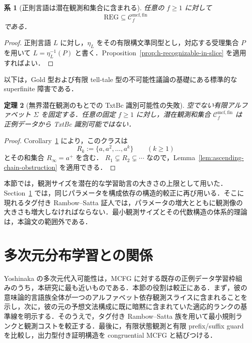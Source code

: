 \documentclass[11pt,a4paper]{ltjsarticle}
\numberwithin{equation}{section}
\theoremstyle{plain}
\newtheorem{theorem}{定理}[section]
\newtheorem{corollary}[theorem]{系}
\theoremstyle{definition}
\theoremstyle{remark}
\newcommand{\Callobs}[1]{\mathcal{C}^{\mathrm{mcf},\mathrm{fin}}_{#1}}
\begin{document}
\begin{corollary}[正則言語は潜在観測和集合に含まれる]
\label{cor:regular-in-latent-union}
任意の \(f\ge1\) に対して
\[
  \mathrm{REG}\subseteq\Callobs{f}
\]
である．
\end{corollary}

\begin{proof}
正則言語 \(L\) に対し，\(\eta_L\) をその有限構文準同型とし，対応する受理集合 \(P\) を用いて \(L=\eta_L^{-1}(P)\) と書く．Proposition~\ref{prop:h-recognizable-in-slice} を適用すればよい．
\end{proof}

以下は，Gold 型および有限 tell-tale 型の不可能性議論の基礎にある標準的な superfinite 障害である．

\begin{theorem}[無界潜在観測のもとでの TxtBc 識別可能性の失敗]
\label{thm:no-advice-nonidentifiability}
空でない有限アルファベット \(\Sigma\) を固定する．任意の固定 \(f\ge1\) に対し，潜在観測和集合 \(\Callobs{f}\) は正例データから TxtBc 識別可能ではない．
\end{theorem}

\begin{proof}
Corollary~\ref{cor:regular-in-latent-union} により，このクラスは
\[
  R_k:=\{a,a^2,\ldots,a^k\}\qquad(k\ge1)
\]
とその和集合 \(R_\infty=a^+\) を含む．
\(R_1\subsetneq R_2\subsetneq\cdots\) なので，Lemma~\ref{lem:ascending-chain-obstruction} を適用できる．
\end{proof}

本節では，観測サイズを潜在的な学習助言の大きさの上限として用いた．Section~\ref{sec:comparison} では，同じパラメータを構成依存の構造的較正に再び用いる．そこに現れるタグ付き Rambow--Satta 証人では，パラメータの増大とともに観測像の大きさも増大しなければならない．最小観測サイズとその代数構造の体系的理論は，本論文の範囲外である．

\section{多次元分布学習との関係}
\label{sec:comparison}

Yoshinaka の多次元代入可能性は，MCFG に対する既存の正例データ学習枠組みのうち，本研究に最も近いものである．本節の役割は較正にある．まず，彼の意味論的言語族全体が一つのアルファベット依存観測スライスに含まれることを示し，次に，彼の元の予想文法構成に既に暗黙に含まれていた適応的ランクの基準線を明示する．そのうえで，タグ付き Rambow--Satta 族を用いて最小規則ランクと観測コストを較正する．最後に，有限状態観測と有限 prefix/suffix guard を比較し，出力型付き証明構造を congruential MCFG と結びつける．
\end{document}
